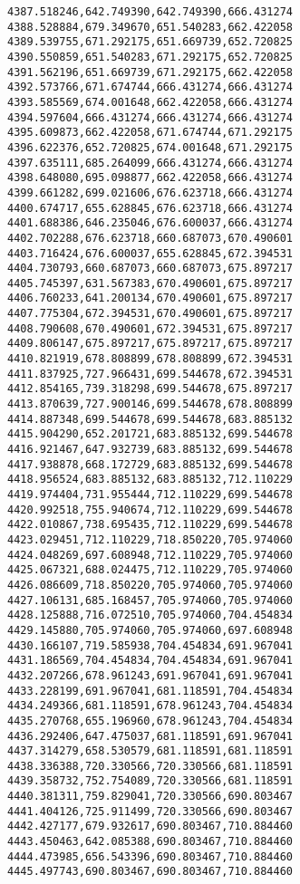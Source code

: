 \documentclass[11pt]{article}
\begin{document}
\begin{Verbatim}[commandchars=\\\{\}]
4387.518246,642.749390,642.749390,666.431274
4388.528884,679.349670,651.540283,662.422058
4389.539755,671.292175,651.669739,652.720825
4390.550859,651.540283,671.292175,652.720825
4391.562196,651.669739,671.292175,662.422058
4392.573766,671.674744,666.431274,666.431274
4393.585569,674.001648,662.422058,666.431274
4394.597604,666.431274,666.431274,666.431274
4395.609873,662.422058,671.674744,671.292175
4396.622376,652.720825,674.001648,671.292175
4397.635111,685.264099,666.431274,666.431274
4398.648080,695.098877,662.422058,666.431274
4399.661282,699.021606,676.623718,666.431274
4400.674717,655.628845,676.623718,666.431274
4401.688386,646.235046,676.600037,666.431274
4402.702288,676.623718,660.687073,670.490601
4403.716424,676.600037,655.628845,672.394531
4404.730793,660.687073,660.687073,675.897217
4405.745397,631.567383,670.490601,675.897217
4406.760233,641.200134,670.490601,675.897217
4407.775304,672.394531,670.490601,675.897217
4408.790608,670.490601,672.394531,675.897217
4409.806147,675.897217,675.897217,675.897217
4410.821919,678.808899,678.808899,672.394531
4411.837925,727.966431,699.544678,672.394531
4412.854165,739.318298,699.544678,675.897217
4413.870639,727.900146,699.544678,678.808899
4414.887348,699.544678,699.544678,683.885132
4415.904290,652.201721,683.885132,699.544678
4416.921467,647.932739,683.885132,699.544678
4417.938878,668.172729,683.885132,699.544678
4418.956524,683.885132,683.885132,712.110229
4419.974404,731.955444,712.110229,699.544678
4420.992518,755.940674,712.110229,699.544678
4422.010867,738.695435,712.110229,699.544678
4423.029451,712.110229,718.850220,705.974060
4424.048269,697.608948,712.110229,705.974060
4425.067321,688.024475,712.110229,705.974060
4426.086609,718.850220,705.974060,705.974060
4427.106131,685.168457,705.974060,705.974060
4428.125888,716.072510,705.974060,704.454834
4429.145880,705.974060,705.974060,697.608948
4430.166107,719.585938,704.454834,691.967041
4431.186569,704.454834,704.454834,691.967041
4432.207266,678.961243,691.967041,691.967041
4433.228199,691.967041,681.118591,704.454834
4434.249366,681.118591,678.961243,704.454834
4435.270768,655.196960,678.961243,704.454834
4436.292406,647.475037,681.118591,691.967041
4437.314279,658.530579,681.118591,681.118591
4438.336388,720.330566,720.330566,681.118591
4439.358732,752.754089,720.330566,681.118591
4440.381311,759.829041,720.330566,690.803467
4441.404126,725.911499,720.330566,690.803467
4442.427177,679.932617,690.803467,710.884460
4443.450463,642.085388,690.803467,710.884460
4444.473985,656.543396,690.803467,710.884460
4445.497743,690.803467,690.803467,710.884460

\end{Verbatim}
\end{document}

